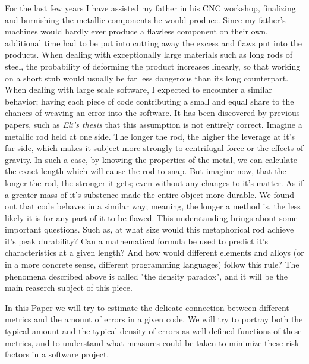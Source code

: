 For the last few years I have assisted my father in his CNC workshop, finalizing
and burnishing the metallic components he would produce. Since my father's machines
would hardly ever produce a flawless component on their own, additional time had 
to be put into cutting away the excess and flaws put into the products.	
When dealing with exceptionally large materials such as long rods of steel, the probability
of deforming the product increases linearly, so that working on a short stub would
usually be far less dangerous than its long counterpart. When dealing with large 
scale software, I expected to encounter a similar behavior; having each piece of code
contributing a small and equal share to the chances of weaving an error into the software.
It has been discovered by previous papers, such as \emph{Eli's thesis} that this assumption
is not entirely correct.
Imagine a metallic rod held at one side. The longer the rod, the higher the leverage at it's 
far side, which makes it subject more strongly to centrifugal force or the effects of gravity.
In such a case, by knowing the properties of the metal, we can calculate the exact length 
which will cause the rod to snap. But imagine now, that the longer the rod, the stronger it gets;
even without any changes to it's matter. As if a greater mass of it's substence made the entire
object more durable.
We found out that code behaves in a similar way; meaning, the longer a method is, the less 
likely it is for any part of it to be flawed. This understanding brings about some important
questions. Such as, at what size would this metaphorical rod achieve it's peak durability?
Can a mathematical formula be used to predict it's characteristics at a given length?
And how would different elements and alloys (or in a more concrete sense, different programming
languages) follow this rule?
The phenomena described above is called "the density paradox", and it will be the main reaserch subject of this piece.

In this Paper we will try to estimate the delicate connection between different metrics and 
the amount of errors in a given code. We will try to portray both the typical amount and the typical density
of errors as well defined functions of these metrics, and to understand what measures could be taken to
minimize these risk factors in a software project.
